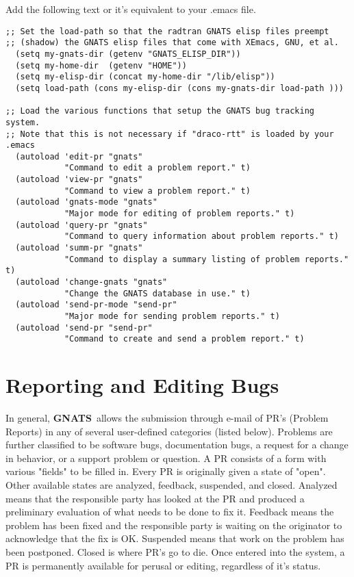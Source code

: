 \documentclass[11pt]{nmemo}
\newcommand{\gnats}{{\normalfont\bfseries GNATS}}
\begin{document}
Add the following text or it's equivalent to your .emacs file.
 \begin{verbatim}
;; Set the load-path so that the radtran GNATS elisp files preempt
;; (shadow) the GNATS elisp files that come with XEmacs, GNU, et al.
  (setq my-gnats-dir (getenv "GNATS_ELISP_DIR"))
  (setq my-home-dir  (getenv "HOME"))
  (setq my-elisp-dir (concat my-home-dir "/lib/elisp"))
  (setq load-path (cons my-elisp-dir (cons my-gnats-dir load-path )))

;; Load the various functions that setup the GNATS bug tracking system.
;; Note that this is not necessary if "draco-rtt" is loaded by your .emacs
  (autoload 'edit-pr "gnats"
            "Command to edit a problem report." t)
  (autoload 'view-pr "gnats"
            "Command to view a problem report." t)
  (autoload 'gnats-mode "gnats"
            "Major mode for editing of problem reports." t)
  (autoload 'query-pr "gnats"
            "Command to query information about problem reports." t)
  (autoload 'summ-pr "gnats"
            "Command to display a summary listing of problem reports." t)
  (autoload 'change-gnats "gnats"
            "Change the GNATS database in use." t)
  (autoload 'send-pr-mode "send-pr"
            "Major mode for sending problem reports." t)
  (autoload 'send-pr "send-pr"
            "Command to create and send a problem report." t)

\end{verbatim}

\section{Reporting and Editing Bugs }

In general, \gnats\ allows the submission through e-mail of PR's (Problem Reports)
in any of several user-defined categories (listed below). Problems 
are further classified  to 
be software bugs, documentation bugs, a request for a change in behavior,
or a support problem or question. A PR consists of a form with
various "fields" to be filled in. Every PR is originally given a
state of "open". Other available states are analyzed, feedback, suspended, and
closed. Analyzed means that the responsible party has looked at the
PR and produced a preliminary evaluation of what needs to be done
to fix it. Feedback means the problem has been fixed and the responsible
party is waiting on the originator to acknowledge that the fix is OK.
Suspended means that work on the problem has been postponed.
Closed is where PR's go to die. Once entered into the system, a PR
is permanently available for perusal or editing, regardless of it's status.
\end{document}
